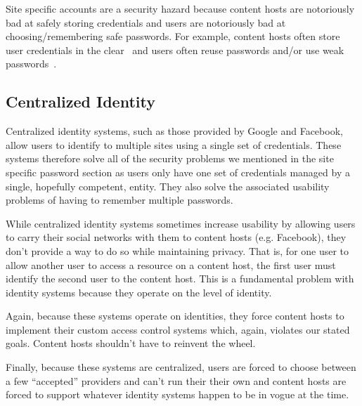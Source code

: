 \documentclass[pdftex,12pt,a4papaer]{report}
\begin{document}

Site specific accounts are a security hazard because content hosts are
notoriously bad at safely storing credentials and users are notoriously bad at
choosing/remembering safe passwords. For example, content hosts often store user
credentials in the clear~\cite{plaintext} and users often reuse passwords and/or
use weak passwords~\cite{ms-passwords}.


\subsection{Centralized Identity}

Centralized identity systems, such as those provided by Google and Facebook,
allow users to identify to multiple sites using a single set of credentials.
These systems therefore solve all of the security problems we mentioned in the
site specific password section as users only have one set of credentials managed
by a single, hopefully competent, entity. They also solve the associated
usability problems of having to remember multiple passwords.

While centralized identity systems sometimes increase usability by allowing
users to carry their social networks with them to content hosts (e.g. Facebook),
they don't provide a way to do so while maintaining privacy. That is, for one
user to allow another user to access a resource on a content host, the first
user must identify the second user to the content host. This is a fundamental
problem with identity systems because they operate on the level of identity.

Again, because these systems operate on identities, they force content hosts to
implement their custom access control systems which, again, violates our stated
goals. Content hosts shouldn't have to reinvent the wheel.

Finally, because these systems are centralized, users are forced to choose
between a few ``accepted'' providers and can't run their their own and content
hosts are forced to support whatever identity systems happen to be in vogue at
the time.
\end{document}
